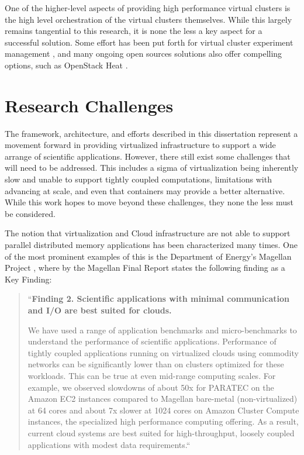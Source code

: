 One of the higher-level aspects of providing high performance virtual clusters is the high level orchestration of the virtual clusters themselves. While this largely remains tangential to this research, it is none the less a key aspect for a successful solution. Some effort has been put forth for virtual cluster experiment management \cite{las2010gce}, and many ongoing open sources solutions also offer compelling options, such as OpenStack Heat \cite{www-openstack-heat}.  


\section{Research Challenges}
\label{sec:chall}

The framework, architecture, and efforts described in this dissertation represent a movement forward in providing virtualized infrastructure to support a wide arrange of scientific applications. However, there still exist some challenges that will need to be addressed.  This includes a sigma of virtualization being inherently slow and unable to support tightly coupled computations, limitations with advancing at scale, and even that containers may provide a better alternative.  While this work hopes to move beyond these challenges, they none the less must be considered. 

The notion that virtualization and Cloud infrastructure are not able to support parallel distributed memory applications has been characterized many times. One of the most prominent examples of this is the Department of Energy's Magellan Project \cite{www-magellan}, where by the Magellan Final Report \cite{MagellanFinal} states the following finding as a Key Finding:
  
\begin{quote}
``\textbf{Finding 2. Scientific applications with minimal communication and I/O are best suited for
clouds.}

We have used a range of application benchmarks and micro-benchmarks to understand the performance of scientific applications. Performance of tightly coupled applications running on virtualized clouds using commodity networks can be significantly lower than on clusters optimized for these workloads. This can be true at even mid-range computing scales. For example, we observed slowdowns of about 50x for PARATEC on the Amazon EC2 instances compared to Magellan bare-metal (non-virtualized) at 64 cores and about 7x slower at 1024 cores on Amazon Cluster Compute instances, the specialized high performance computing offering. As a result, current cloud systems are best suited for high-throughput, loosely coupled applications with modest data requirements.``
\end{quote}

